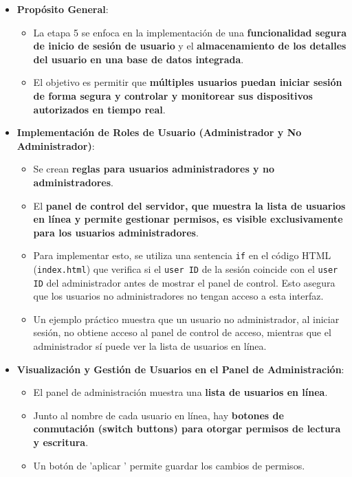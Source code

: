 \documentclass{report}
\begin{document}
\begin{itemize}
    \item \textbf{Propósito General}:
    \begin{itemize}
        \item La etapa 5 se enfoca en la implementación de una \textbf{funcionalidad segura de inicio de sesión de usuario} y el \textbf{almacenamiento 
        de los detalles del usuario en una base de datos integrada}.
        \item El objetivo es permitir que \textbf{múltiples usuarios puedan iniciar sesión de forma segura y controlar y monitorear sus dispositivos 
        autorizados en tiempo real}.
    \end{itemize}
    \item \textbf{Implementación de Roles de Usuario (Administrador y No Administrador)}:
    \begin{itemize}
        \item Se crean \textbf{reglas para usuarios administradores y no administradores}.
        \item El \textbf{panel de control del servidor, que muestra la lista de usuarios en línea y permite gestionar permisos, es visible exclusivamente para 
        los usuarios administradores}.
        \item Para implementar esto, se utiliza una sentencia \texttt{if} en el código HTML (\verb|index.html|) que verifica si el \texttt{user ID} de la 
        sesión coincide con el \texttt{user ID} del administrador antes de mostrar el panel de control. Esto asegura que los usuarios no administradores no 
        tengan acceso a esta interfaz.
        \item Un ejemplo práctico muestra que un usuario no administrador, al iniciar sesión, no obtiene acceso al panel de control de acceso, mientras 
        que el administrador sí puede ver la lista de usuarios en línea.
    \end{itemize}
    \item \textbf{Visualización y Gestión de Usuarios en el Panel de Administración}:
    \begin{itemize}
        \item El panel de administración muestra una \textbf{lista de usuarios en línea}.
        \item Junto al nombre de cada usuario en línea, hay \textbf{botones de conmutación (switch buttons) para otorgar permisos de lectura y escritura}.
        \item Un botón de  'aplicar ' permite guardar los cambios de permisos.

\end{itemize}
\end{itemize}
\end{document}
